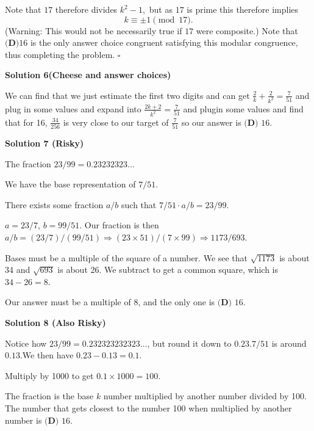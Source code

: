 \begin{enumerate}
 Note that $17$ therefore divides $k^2 - 1,$ but as $17$ is prime this therefore implies 
 \[k \equiv \pm 1 \pmod{17}.\] (Warning: This would not be necessarily true if $17$ were composite.) Note that $\boxed{\textbf{(D)} 16 }$ is the only answer choice congruent satisfying this modular congruence, thus completing the problem. $\square$




\textbf{Solution 6(Cheese and answer choices)}

We can find that we just estimate the first two digits and can get $\frac{2}{k} + \frac{2}{k^2} = \frac{7}{51}$ and plug in some values and expand into $\frac{2k+2}{k^2} = \frac{7}{51}$ and plugin some values and find that for 16, $\frac{34}{256}$ is very close to our target of $\frac{7}{51}$ so our answer is $\boxed{\textbf{(D) }16}$.

 



\textbf{Solution 7 (Risky)}

The fraction \( 23/99 = 0.23232323... \)

 We have the base representation of \( 7/51 \).

 There exists some fraction \( a/b \) such that \( 7/51 \cdot a/b = 23/99 \).

 \( a = 23/7 \), \( b = 99/51 \). Our fraction is then \( a/b = (23/7) / (99/51) \Rightarrow (23 \times 51) / (7 \times 99) \Rightarrow 1173/693 \).

 Bases must be a multiple of the square of a number. We see that \( \sqrt{1173} \) is about 34 and \( \sqrt{693} \) is about 26. We subtract to get a common square, which is \( 34-26 = 8 \).

 Our answer must be a multiple of 8, and the only one is $\boxed{\textbf{(D) }16}$.

 



\textbf{Solution 8 (Also Risky)}

Notice how \( 23/99 = 0.232323232323\ldots \), but round it down to \( 0.23 \).\( 7/51 \) is around \( 0.13 \).We then have \( 0.23 - 0.13 = 0.1 \).

 Multiply by 1000 to get \( 0.1 \times 1000 = 100 \).

 The fraction is the base \( k \) number multiplied by another number divided by 100. The number that gets closest to the number 100 when multiplied by another number is $\boxed{\textbf{(D) }16}$.

 




\end{enumerate}
